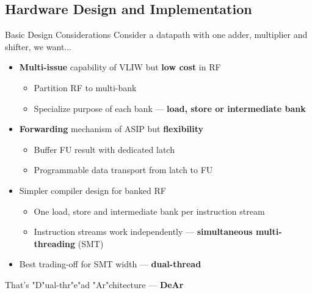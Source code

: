 \documentclass[handout]{beamer}
\begin{document}
\begin{CJK}{UTF8}{bkai}
            \subsection{Hardware Design and Implementation}
            \begin{frame}{Basic Design Considerations}
                \pause
                Consider a datapath with one adder, multiplier and shifter, we want... \\
                \begin{itemize}
                    \pause
                    \item \textbf{Multi-issue} capability of VLIW but \textbf{low cost} in RF
                        \begin{itemize}
                            \item Partition RF to multi-bank
                            \item Specialize purpose of each bank --- \textbf{load, store or intermediate bank}
                        \end{itemize}
                    \pause
                    \item \textbf{Forwarding} mechanism of ASIP but \textbf{flexibility}
                        \begin{itemize}
                            \item Buffer FU result with dedicated latch
                            \item Programmable data transport from latch to FU
                        \end{itemize}
                    \pause
                    \item Simpler compiler design for banked RF
                        \begin{itemize}
                            \item One load, store and intermediate bank per instruction stream 
                            \item Instruction streams work independently --- \textbf{simultaneous multi-threading} (SMT)
                        \end{itemize}
                    \pause
                    \item Best trading-off for SMT width --- \textbf{dual-thread}
                \end{itemize}
                \pause
                \begin{center}
                {\large{That's "D"ual-thr"e"ad "Ar"chitecture --- \textbf{DeAr}}}
                \end{center}
            \end{frame}


\end{CJK}
\end{document}
